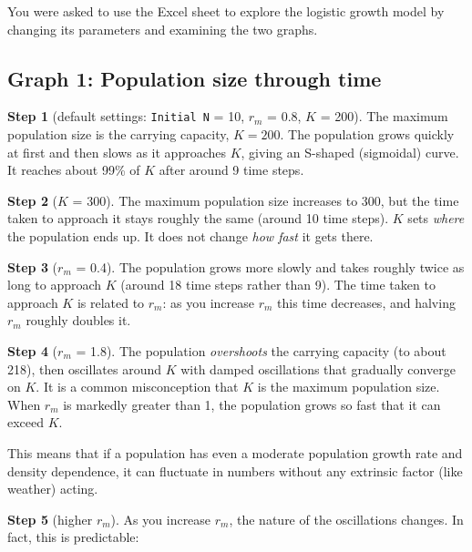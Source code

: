 \documentclass[
  a4paper]{book}
\begin{document}
You were asked to use the Excel sheet to explore the logistic growth model by changing its parameters and examining the two graphs.

\subsection{Graph 1: Population size through time}\label{graph-1-population-size-through-time-1}

\textbf{Step 1} (default settings: \texttt{Initial\ N} = 10, \(r_m\) = 0.8, \(K\) = 200). The maximum population size is the carrying capacity, \(K = 200\). The population grows quickly at first and then slows as it approaches \(K\), giving an S-shaped (sigmoidal) curve. It reaches about 99\% of \(K\) after around 9 time steps.

\textbf{Step 2} (\(K\) = 300). The maximum population size increases to 300, but the time taken to approach it stays roughly the same (around 10 time steps). \(K\) sets \emph{where} the population ends up. It does not change \emph{how fast} it gets there.

\textbf{Step 3} (\(r_m\) = 0.4). The population grows more slowly and takes roughly twice as long to approach \(K\) (around 18 time steps rather than 9). The time taken to approach \(K\) is related to \(r_m\): as you increase \(r_m\) this time decreases, and halving \(r_m\) roughly doubles it.

\textbf{Step 4} (\(r_m\) = 1.8). The population \emph{overshoots} the carrying capacity (to about 218), then oscillates around \(K\) with damped oscillations that gradually converge on \(K\). It is a common misconception that \(K\) is the maximum population size. When \(r_m\) is markedly greater than 1, the population grows so fast that it can exceed \(K\).

This means that if a population has even a moderate population growth rate and density dependence, it can fluctuate in numbers without any extrinsic factor (like weather) acting.

\textbf{Step 5} (higher \(r_m\)). As you increase \(r_m\), the nature of the oscillations changes. In fact, this is predictable:
\end{document}
